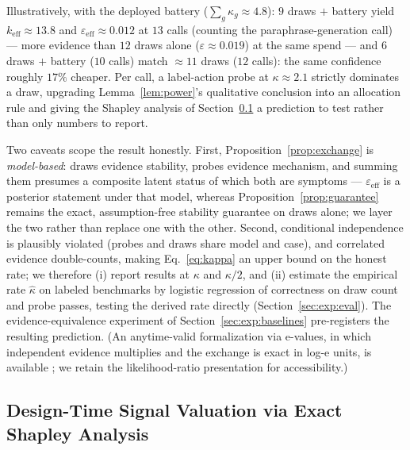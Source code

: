 \documentclass[11pt]{article}
\newcommand{\keff}{k_{\mathrm{eff}}}
\begin{document}
Illustratively, with the deployed battery
($\sum_g \kappa_g \approx 4.8$): $9$ draws $+$ battery yield
$\keff \approx 13.8$ and $\varepsilon_{\mathrm{eff}} \approx 0.012$
at $13$ calls (counting the paraphrase-generation call) --- more
evidence than $12$ draws alone ($\varepsilon \approx 0.019$) at the same
spend --- and $6$ draws $+$ battery ($10$ calls) match $\approx 11$
draws ($12$ calls): the same confidence roughly $17\%$ cheaper. Per call, a label-action probe at
$\kappa \approx 2.1$ strictly dominates a draw, upgrading
Lemma~\ref{lem:power}'s qualitative conclusion into an allocation rule
and giving the Shapley analysis of Section~\ref{sec:method:shapley} a
prediction to test rather than only numbers to report.

Two caveats scope the result honestly. First,
Proposition~\ref{prop:exchange} is \emph{model-based}: draws evidence
stability, probes evidence mechanism, and summing them presumes a
composite latent status of which both are symptoms ---
$\varepsilon_{\mathrm{eff}}$ is a posterior statement under that
model, whereas Proposition~\ref{prop:guarantee} remains the exact,
assumption-free stability guarantee on draws alone; we layer the two
rather than replace one with the other. Second, conditional
independence is plausibly violated (probes and draws share model and
case), and correlated evidence double-counts, making
Eq.~\eqref{eq:kappa} an upper bound on the honest rate; we therefore
(i) report results at $\kappa$ and $\kappa/2$, and (ii) estimate the
empirical rate $\hat\kappa$ on labeled benchmarks by logistic
regression of correctness on draw count and probe passes, testing the
derived rate directly (Section~\ref{sec:exp:eval}). The
evidence-equivalence experiment of Section~\ref{sec:exp:baselines}
pre-registers the resulting prediction. (An anytime-valid
formalization via e-values, in which independent evidence multiplies
and the exchange is exact in log-e units, is available
\citep{ramdas2023}; we retain the likelihood-ratio presentation for
accessibility.)

\subsection{Design-Time Signal Valuation via Exact Shapley Analysis}
\label{sec:method:shapley}
\end{document}
